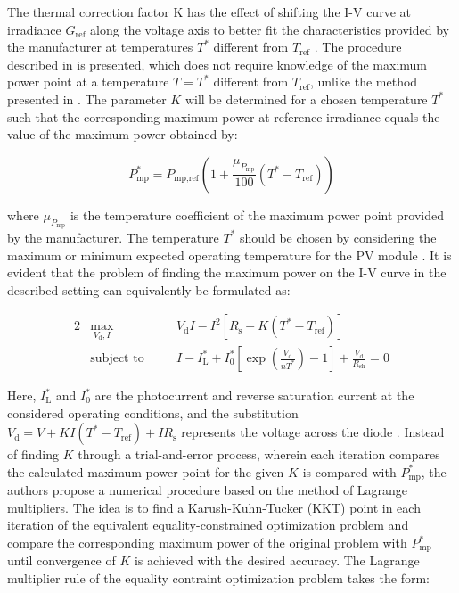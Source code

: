 The thermal correction factor K has the effect of shifting the I-V curve at irradiance
\(G_{\text{ref}}\) along the voltage axis to better fit the characteristics provided by the
manufacturer at temperatures \(T^*\) different from \(T_{\text{ref}}\) \cite[p. 1365]{LoBrano}.
The procedure described in \cite{Orioli} is presented, which does not require knowledge
of the maximum power point at a temperature \(T = T^*\) different from \(T_{\text{ref}}\),
unlike the method presented in \cite{LoBrano}. The parameter \(K\) will be determined for
a chosen temperature \(T^*\) such that the corresponding maximum power at reference
irradiance equals the value of the maximum power obtained by:

\begin{equation}
    P_{\text{mp}}^* = P_{\text{mp,ref}} (1 + \frac{\mu_{P_{\text{mp}}}}{100} (T^* - T_{\text{ref}}))
    \label{eq:Maximum_power_in_correspondence_to_temperature_coefficient}
\end{equation}

\noindent
where \(\mu_{P_{\text{mp}}}\) is the temperature coefficient of the
maximum power point provided by the manufacturer. The temperature \(T^*\)
should be chosen by considering the maximum or minimum expected operating
temperature for the PV module \cite[p. 1365]{LoBrano}.
It is evident that the problem of finding the maximum power on the I-V
curve in the described setting can equivalently be formulated as:

\begin{alignat}{2}
    & \max_{V_{\text{d}}, I}    & \quad & V_{\text{d}} I - I^2 [R_{\text{s}} + K(T^* - T_{\text{ref}})]
    \label{eq:Parameter_K_optimization_problem_objective} \\
    & \text{subject to} & \quad & I - I_{\text{L}}^* + I_{0}^* \left[\exp\left(\frac{V_{\text{d}}}{nT^*}\right) - 1\right] + \frac{V_{\text{d}}}{R_{\text{sh}}} = 0
    \label{eq:Parameter_K_optimization_problem_constraint}
\end{alignat}

\noindent
Here, \(I_{\text{L}}^*\) and \(I_{0}^*\) are the photocurrent and reverse saturation current
at the considered operating conditions, and the substitution \(V_{\text{d}} = V + KI(T^* - T_{\text{ref}}) +IR_{\text{s}}\)
represents the voltage across the diode \cite[p. 1166]{Orioli}. Instead of
finding \(K\) through a trial-and-error process, wherein each iteration compares
the calculated maximum power point for the given \(K\) is compared with \(P_{\text{mp}}^*\), the
authors propose a numerical procedure based on the method of Lagrange
multipliers. The idea is to find a Karush-Kuhn-Tucker (KKT) point in
each iteration of the equivalent equality-constrained optimization
problem and compare the corresponding maximum power of the original
problem with \(P_{\text{mp}}^*\)  until convergence of \(K\) is achieved
with the desired accuracy. The Lagrange multiplier rule of the equality
contraint optimization problem takes the form:


